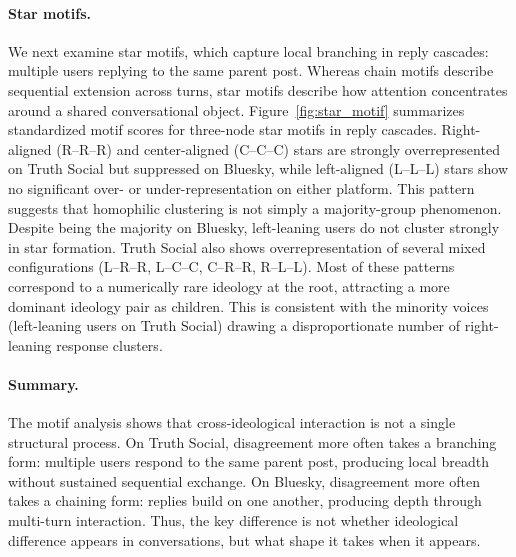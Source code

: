 \documentclass[letterpaper]{article} %
\newcommand{\cb}[1]{\textcolor{blue}{CB: #1}}
\begin{document}
\paragraph{Star motifs.}
We next examine star motifs, which capture local branching in reply cascades: multiple users replying to the same parent post. Whereas chain motifs describe sequential extension across turns, star motifs describe how attention concentrates around a shared conversational object. Figure~\ref{fig:star_motif} summarizes standardized motif scores for three-node star motifs in reply cascades. Right-aligned (R–R–R) and center-aligned (C–C–C) stars are strongly overrepresented on Truth Social but suppressed on Bluesky, while left-aligned (L–L–L) stars show no significant over- or under-representation on either platform. This pattern suggests that homophilic clustering is not simply a majority-group phenomenon. Despite being the majority on Bluesky, left-leaning users do not cluster strongly in star formation.
Truth Social also shows overrepresentation of several mixed configurations (L--R--R, L--C--C, C--R--R, R--L--L). Most of these patterns correspond to a numerically rare ideology at the root, attracting a more dominant ideology pair as children. This is consistent with the minority voices (left-leaning users on Truth Social) drawing a disproportionate number of right-leaning response clusters. 


\paragraph{Summary.}
The motif analysis shows that cross-ideological interaction is not a single structural process. On Truth Social, disagreement more often takes a branching form: multiple users respond to the same parent post, producing local breadth without sustained sequential exchange. On Bluesky, disagreement more often takes a chaining form: replies build on one another, producing depth through multi-turn interaction. Thus, the key difference is not whether ideological difference appears in conversations, but what shape it takes when it appears.
\end{document}
